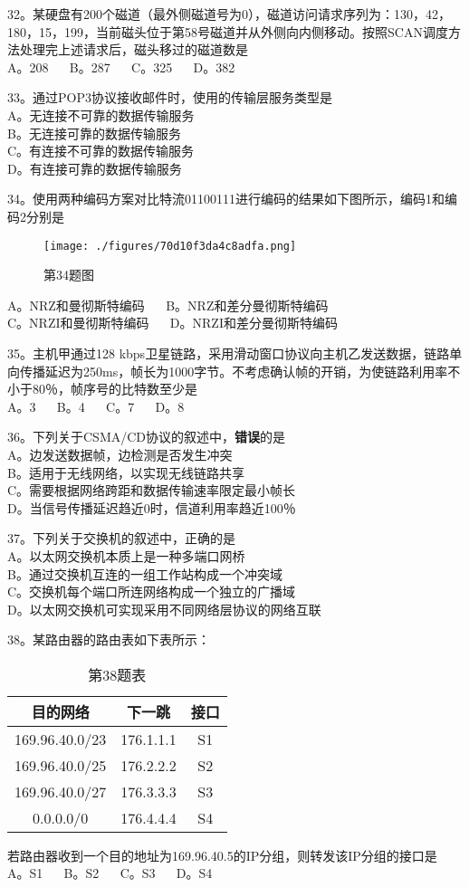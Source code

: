 32。某硬盘有200个磁道（最外侧磁道号为0），磁道访问请求序列为：130，42，180，15，199，当前磁头位于第58号磁道并从外侧向内侧移动。按照SCAN调度方法处理完上述请求后，磁头移过的磁道数是 \\
A。208 $\quad$ B。287 $\quad$ C。325 $\quad$ D。382

33。通过POP3协议接收邮件时，使用的传输层服务类型是 \\
A。无连接不可靠的数据传输服务 \\
B。无连接可靠的数据传输服务 \\
C。有连接不可靠的数据传输服务 \\
D。有连接可靠的数据传输服务

34。使用两种编码方案对比特流01100111进行编码的结果如下图所示，编码1和编码2分别是
\begin{figure}[ht]
\centering
\texttt{[image: ./figures/70d10f3da4c8adfa.png]}
\caption{第34题图} \label{fig_CSN15_2}
\end{figure}
A。NRZ和曼彻斯特编码 $\quad$ B。NRZ和差分曼彻斯特编码 \\
C。NRZI和曼彻斯特编码 $\quad$ D。NRZI和差分曼彻斯特编码

35。主机甲通过128 kbps卫星链路，采用滑动窗口协议向主机乙发送数据，链路单向传播延迟为250ms，帧长为1000字节。不考虑确认帧的开销，为使链路利用率不小于80％，帧序号的比特数至少是 \\
A。3 $\quad$ B。4 $\quad$ C。7 $\quad$ D。8

36。下列关于CSMA/CD协议的叙述中，\textbf{错误}的是 \\
A。边发送数据帧，边检测是否发生冲突 \\
B。适用于无线网络，以实现无线链路共享 \\
C。需要根据网络跨距和数据传输速率限定最小帧长 \\
D。当信号传播延迟趋近0时，信道利用率趋近100％

37。下列关于交换机的叙述中，正确的是 \\
A。以太网交换机本质上是一种多端口网桥 \\
B。通过交换机互连的一组工作站构成一个冲突域 \\
C。交换机每个端口所连网络构成一个独立的广播域 \\
D。以太网交换机可实现采用不同网络层协议的网络互联

38。某路由器的路由表如下表所示：
\begin{table}[ht]
\centering
\caption{第38题表}\label{tab_CSN15_1}
\begin{tabular}{|c|c|c|}
\hline
目的网络 & 下一跳 & 接口 \\
\hline
169.96.40.0/23 & 176.1.1.1 & S1 \\
\hline
169.96.40.0/25 & 176.2.2.2 & S2 \\
\hline
169.96.40.0/27 & 176.3.3.3 & S3 \\
\hline
0.0.0.0/0 & 176.4.4.4 & S4 \\
\hline
\end{tabular}
\end{table}
若路由器收到一个目的地址为169.96.40.5的IP分组，则转发该IP分组的接口是 \\
A。S1 $\quad$ B。S2 $\quad$ C。S3 $\quad$ D。S4

